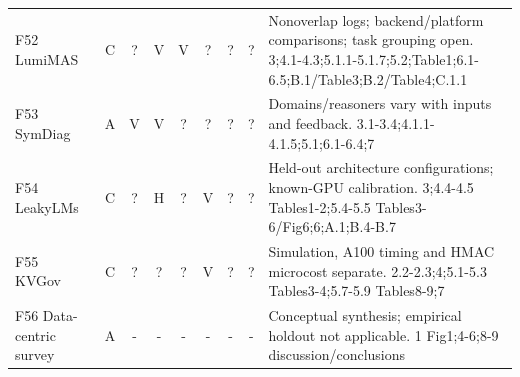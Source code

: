 \begin{table}[p]
\begin{tabularx}{\textwidth}{@{}p{}cccccccY@{}}
F52 LumiMAS~\cite{solomon2026lumimas} & C & ? & V & V & ? & ? & ? & Nonoverlap logs; backend/platform comparisons; task grouping open. 3;4.1-4.3;5.1.1-5.1.7;5.2;Table1;6.1-6.5;B.1/Table3;B.2/Table4;C.1.1\\
F53 SymDiag~\cite{cui2026symdiag} & A & V & V & ? & ? & ? & ? & Domains/reasoners vary with inputs and feedback. 3.1-3.4;4.1.1-4.1.5;5.1;6.1-6.4;7\\
F54 LeakyLMs~\cite{majidi2026leakylms} & C & ? & H & ? & V & ? & ? & Held-out architecture configurations; known-GPU calibration. 3;4.4-4.5 Tables1-2;5.4-5.5 Tables3-6/Fig6;6;A.1;B.4-B.7\\
F55 KVGov~\cite{addagada2026kvgov} & C & ? & ? & ? & V & ? & ? & Simulation, A100 timing and HMAC microcost separate. 2.2-2.3;4;5.1-5.3 Tables3-4;5.7-5.9 Tables8-9;7\\
F56 Data-centric survey~\cite{lahjouji2026datacentric} & A & - & - & - & - & - & - & Conceptual synthesis; empirical holdout not applicable. 1 Fig1;4-6;8-9 discussion/conclusions\\
\bottomrule\end{tabularx}\end{table}
